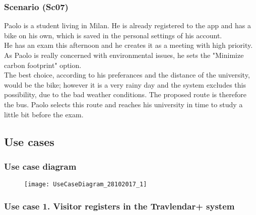 \documentclass[a4paper,leqno]{book}
\begin{document}
\subsubsection{Scenario (Sc07)}
Paolo is a student living in Milan. He is already registered to the app and has a bike on his own, which is saved in the personal settings of his account.\\
He has an exam this afternoon and he creates it as a meeting with high priority. As Paolo is really concerned with environmental issues, he sets the "Minimize carbon footprint" option.\\
The best choice, according to his preferances and the distance of the university, would be the bike; however it is a very rainy day and the system excludes this possibility, due to the bad weather conditions.
The proposed route is therefore the bus. Paolo selects this route and reaches his university in time to study a little bit before the exam.

\newpage
\subsection{Use cases}
\subsubsection{Use case diagram}
\begin{figure}[!h]
	\begin{center}
		\texttt{[image: UseCaseDiagram\_28102017\_1]}
	\end{center}
\end{figure}
\newpage

\subsubsection{Use case 1. Visitor registers in the Travlendar+ system}
\end{document}
